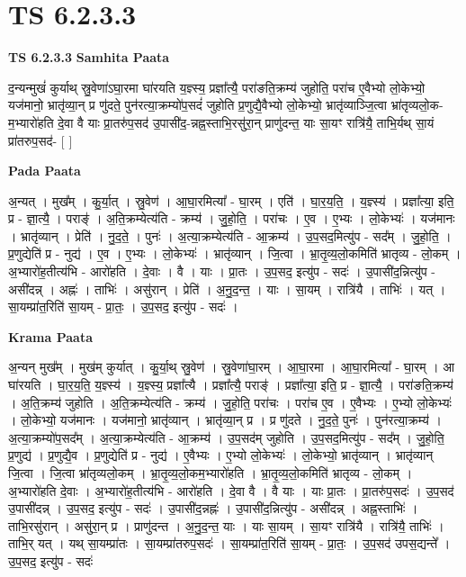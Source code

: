 \documentclass[17pt]{extarticle}
\begin{document}
\section{ TS 6.2.3.3 }

\textbf{TS 6.2.3.3 } \newline
\textbf{Samhita Paata} \newline

द॒न्यन्मुखं॑ कुर्याथ् स्रु॒वेणा॑ऽघा॒रमा घा॑रयति य॒ज्ञ्स्य॒ प्रज्ञा᳚त्यै॒ परा॑ङति॒क्रम्य॑ जुहोति॒ परा॑च ए॒वैभ्यो लो॒केभ्यो॒ यज॑मानो॒ भ्रातृ॑व्या॒न् प्र णु॑दते॒ पुन॑रत्या॒क्रम्यो॑प॒सदं॑ जुहोति प्र॒णुद्यै॒वैभ्यो लो॒केभ्यो॒ भ्रातृ॑व्याञ्जि॒त्वा भ्रा॑तृव्यलो॒क-म॒भ्यारो॑हति दे॒वा वै याः प्रा॒तरु॑प॒सद॑ उ॒पासी॑द॒-न्नह्न॒स्ताभि॒रसु॑रा॒न् प्राणु॑दन्त॒ याः सा॒यꣳ रात्रि॑यै॒ ताभि॒र्यथ् सा॒यं प्रा॑तरुप॒सद॑- [  ] \newline

\textbf{Pada Paata} \newline

अ॒न्यत् । मुख᳚म् । कु॒र्या॒त् । स्रु॒वेण॑ । आ॒घा॒रमित्या᳚ - घा॒रम् । एति॑ । घा॒र॒य॒ति॒ । य॒ज्ञ्स्य॑ । प्रज्ञा᳚त्या॒ इति॒ प्र - ज्ञा॒त्यै॒ । पराङ्॑ । अ॒ति॒क्रम्येत्य॑ति - क्रम्य॑ । जु॒हो॒ति॒ । परा॑चः । ए॒व । ए॒भ्यः । लो॒केभ्यः॑ । यज॑मानः । भ्रातृ॑व्यान् । प्रेति॑ । नु॒द॒ते॒ । पुनः॑ । अ॒त्या॒क्रम्येत्य॑ति - आ॒क्रम्य॑ । उ॒प॒सद॒मित्यु॑प - सद᳚म् । जु॒हो॒ति॒ । प्र॒णुद्येति॑ प्र - नुद्य॑ । ए॒व । ए॒भ्यः । लो॒केभ्यः॑ । भ्रातृ॑व्यान् । जि॒त्वा । भ्रा॒तृ॒व्य॒लो॒कमिति॑ भ्रातृव्य - लो॒कम् । अ॒भ्यारो॑ह॒तीत्य॑भि - आरो॑हति । दे॒वाः । वै । याः । प्रा॒तः । उ॒प॒सद॒ इत्यु॑प - सदः॑ । उ॒पासी॑द॒न्नित्यु॑प - असी॑दन्न् । अह्नः॑ । ताभिः॑ । असु॑रान् । प्रेति॑ । अ॒नु॒द॒न्त॒ । याः । सा॒यम् । रात्रि॑यै । ताभिः॑ । यत् । सा॒यम्प्रा॑त॒रिति॑ सा॒यम् - प्रा॒तः॒ । उ॒प॒सद॒ इत्यु॑प - सदः॑ ।  \newline


\textbf{Krama Paata} \newline

अ॒न्यन् मुख᳚म् । मुख॑म् कुर्यात् । कु॒र्या॒थ् स्रु॒वेण॑ । स्रु॒वेणा॑घा॒रम् । आ॒घा॒रमा । आ॒घा॒रमित्या᳚ - घा॒रम् । 
आ घा॑रयति । घा॒र॒य॒ति॒ य॒ज्ञ्स्य॑ । य॒ज्ञ्स्य॒ प्रज्ञा᳚त्यै । प्रज्ञा᳚त्यै॒ पराङ्‍॑ । प्रज्ञा᳚त्या॒ इति॒ प्र - ज्ञा॒त्यै॒ । परा॑ङति॒क्रम्य॑ । अ॒ति॒क्रम्य॑ जुहोति । अ॒ति॒क्रम्येत्य॑ति - क्रम्य॑ । जु॒हो॒ति॒ परा॑चः । परा॑च ए॒व । ए॒वैभ्यः । ए॒भ्यो लो॒केभ्यः॑ । लो॒केभ्यो॒ यज॑मानः । यज॑मानो॒ भ्रातृ॑व्यान् । भ्रातृ॑व्या॒न् प्र । प्र णु॑दते । नु॒द॒ते॒ पुनः॑ । पुन॑रत्या॒क्रम्य॑ । अ॒त्या॒क्रम्यो॑प॒सद᳚म् । अ॒त्या॒क्रम्येत्य॑ति - आ॒क्रम्य॑ । उ॒प॒सद॑म् जुहोति । उ॒प॒सद॒मित्यु॑प - सद᳚म् । जु॒हो॒ति॒ प्र॒णुद्य॑ । प्र॒णुद्यै॒व । प्र॒णुद्येति॑ प्र - नुद्य॑ । ए॒वैभ्यः । ए॒भ्यो लो॒केभ्यः॑ । लो॒केभ्यो॒ भ्रातृ॑व्यान् । भ्रातृ॑व्यान् जि॒त्वा । जि॒त्वा भ्रा॑तृव्यलो॒कम् । भ्रा॒तृ॒व्य॒लो॒कम॒भ्यारो॑हति । भ्रा॒तृ॒व्य॒लो॒कमिति॑ भ्रातृव्य - लो॒कम् । अ॒भ्यारो॑हति दे॒वाः । अ॒भ्यारो॑ह॒तीत्य॑भि - आरो॑हति । दे॒वा वै । वै याः । याः प्रा॒तः । प्रा॒तरु॑प॒सदः॑ । उ॒प॒सद॑ उ॒पासी॑दन्न् । उ॒प॒सद॒ इत्यु॑प - सदः॑ । उ॒पासी॑द॒न्नह्नः॑ । उ॒पासी॑द॒न्नित्यु॑प - असी॑दन्न् । अह्न॒स्ताभिः॑ । ताभि॒रसु॑रान् । असु॑रा॒न् प्र । प्राणु॑दन्त । अ॒नु॒द॒न्त॒ याः । याः सा॒यम् । सा॒यꣳ रात्रि॑यै । रात्रि॑यै॒ ताभिः॑ । ताभि॒र् यत् । यथ् सा॒यम्प्रा॑तः । सा॒यम्प्रा॑तरुप॒सदः॑ । सा॒यम्प्रा॑त॒रिति॑ सा॒यम् - प्रा॒तः॒ । उ॒प॒सद॑ उपस॒द्यन्ते᳚ । उ॒प॒सद॒ इत्यु॑प - सदः॑ \newline
\end{document}
